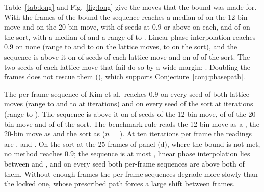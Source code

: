 Table~\ref{tab:long} and Fig.~\ref{fig:long} give the moves that the bound was made for. With the frames of the bound the sequence reaches a median of \longAMed{} on the 12-bin move and \longBMed{} on the 20-bin move, with \longAMet{} of \longSeeds{} seeds at $0.9$ or above on each, and \cTenMet{} of \cTenSeeds{} on the sort, with a median of \cTenMetMed{} and a range of \cTenMetMin{} to \cTenMetMax{}. Linear phase interpolation reaches $0.9$ on none (range \longALpiMin{} to \longALpiMax{} and \longBLpiMin{} to \longBLpiMax{} on the lattice moves, \cTenLpiMin{} to \cTenLpiMax{} on the sort), and the sequence is above it on \longABLeadsLpi{} of \longSeeds{} seeds of each lattice move and on \cTenBLeads{} of \cTenSeeds{} of the sort. The two seeds of each lattice move that fail do so by a wide margin: \longFailList{}. Doubling the frames does not rescue them (\longTwiceList{}), which supports Conjecture~\ref{conj:phasepath}.

The per-frame sequence of Kim et al.\ reaches $0.9$ on every seed of both lattice moves (range \longAKimFiveMin{} to \longAKimFiveMax{} and \longBKimFiveMin{} to \longBKimFiveMax{} at \parKimIters{} iterations) and on every seed of the sort at \parKimIters{} iterations (range \cTenKimFiveMin{} to \cTenKimFiveMax{}). The sequence is above it on \longABLeadsKimFive{} of \longSeeds{} seeds of the 12-bin move, \longBBLeadsKimFive{} of \longSeeds{} of the 20-bin move and \cTenBLeadsKimFive{} of \cTenSeeds{} of the sort. The benchmark rule reads the 12-bin move as a \longAReadKimFive{}, the 20-bin move as \longBReadKimFive{} and the sort as \cTenReadKimFive{} ($n$ = \cTenReadKimFiveN). At ten iterations per frame the readings are \longAReadKimTen{}, \longBReadKimTen{} and \cTenReadKimTen{}. On the sort at the 25 frames of panel (d), where the bound is not met, no method reaches $0.9$; the sequence is at most \cTenBEqualMax{}, linear phase interpolation lies between \cTenLEqualMin{} and \cTenLEqualMax{}, and on every seed both per-frame sequences are above both of them. Without enough frames the per-frame sequences degrade more slowly than the locked one, whose prescribed path forces a large shift between frames.

\begin{table}[t]
\centering\small
\caption{The frame-count equation against the frames used: longest move, frames of the bound, frames used, peak shift per frame, median ratio reached by the flicker-bounded sequence and seeds at $0.9$ or above.}
\label{tab:bound}
\end{table}

